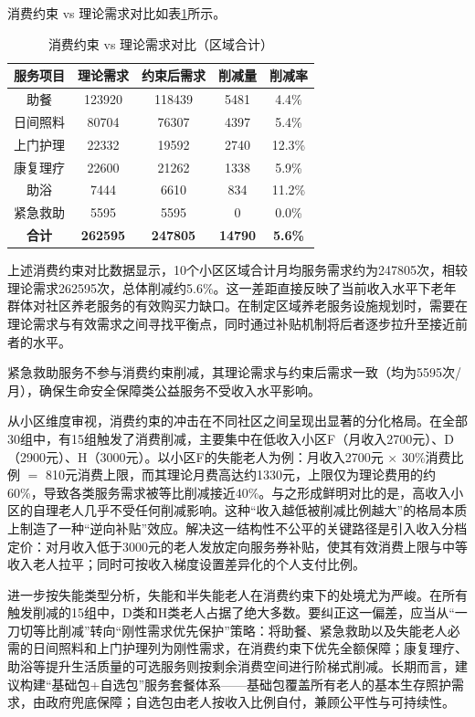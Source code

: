 \documentclass[UTF8]{ctexart}
\begin{document}
消费约束 vs 理论需求对比如表\ref{tab:compare_constraint}所示。

\begin{table}[H]
\centering
\caption{消费约束 vs 理论需求对比（区域合计）}
\label{tab:compare_constraint}
\renewcommand{\arraystretch}{1.3}
\begin{tabular}{|c|c|c|c|c|}
\hline
\textbf{服务项目} & \textbf{理论需求} & \textbf{约束后需求} & \textbf{削减量} & \textbf{削减率} \\
\hline
助餐 & 123920 & 118439 & 5481 & 4.4\% \\
\hline
日间照料 & 80704 & 76307 & 4397 & 5.4\% \\
\hline
上门护理 & 22332 & 19592 & 2740 & 12.3\% \\
\hline
康复理疗 & 22600 & 21262 & 1338 & 5.9\% \\
\hline
助浴 & 7444 & 6610 & 834 & 11.2\% \\
\hline
紧急救助 & 5595 & 5595 & 0 & 0.0\% \\
\hline
\textbf{合计} & \textbf{262595} & \textbf{247805} & \textbf{14790} & \textbf{5.6\%} \\
\hline
\end{tabular}
\end{table}

上述消费约束对比数据显示，10个小区区域合计月均服务需求约为247805次，相较理论需求262595次，总体削减约5.6\%。这一差距直接反映了当前收入水平下老年群体对社区养老服务的有效购买力缺口。在制定区域养老服务设施规划时，需要在理论需求与有效需求之间寻找平衡点，同时通过补贴机制将后者逐步拉升至接近前者的水平。

紧急救助服务不参与消费约束削减，其理论需求与约束后需求一致（均为5595次/月），确保生命安全保障类公益服务不受收入水平影响。

从小区维度审视，消费约束的冲击在不同社区之间呈现出显著的分化格局。在全部30组中，有15组触发了消费削减，主要集中在低收入小区F（月收入2700元）、D（2900元）、H（3000元）。以小区F的失能老人为例：月收入2700元 $\times$ 30\%消费比例 $=$ 810元消费上限，而其理论月费高达约1330元，上限仅为理论费用的约60\%，导致各类服务需求被等比削减接近40\%。与之形成鲜明对比的是，高收入小区的自理老人几乎不受任何削减影响。这种“收入越低被削减比例越大”的格局本质上制造了一种“逆向补贴”效应。解决这一结构性不公平的关键路径是引入收入分档定价：对月收入低于3000元的老人发放定向服务券补贴，使其有效消费上限与中等收入老人拉平；同时可按收入梯度设置差异化的个人支付比例。

进一步按失能类型分析，失能和半失能老人在消费约束下的处境尤为严峻。在所有触发削减的15组中，D类和H类老人占据了绝大多数。要纠正这一偏差，应当从“一刀切等比削减”转向“刚性需求优先保护”策略：将助餐、紧急救助以及失能老人必需的日间照料和上门护理列为刚性需求，在消费约束下优先全额保障；康复理疗、助浴等提升生活质量的可选服务则按剩余消费空间进行阶梯式削减。长期而言，建议构建“基础包+自选包”服务套餐体系——基础包覆盖所有老人的基本生存照护需求，由政府兜底保障；自选包由老人按收入比例自付，兼顾公平性与可持续性。
\end{document}
